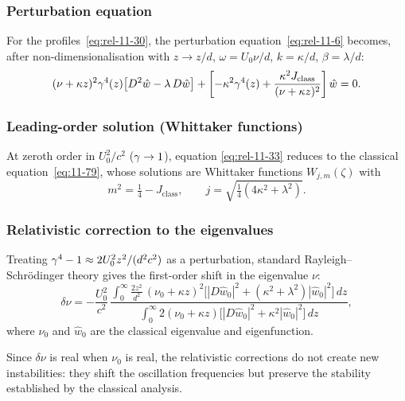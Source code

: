 \subsubsection{Perturbation equation}
For the profiles~\eqref{eq:rel-11-30}, the perturbation
equation~\eqref{eq:rel-11-6} becomes, after non-dimensionalisation
with $z\to z/d$, $\omega=U_{0}\nu/d$, $k=\kappa/d$,
$\beta=\lambda/d$:
\begin{equation}
\label{eq:rel-11-33}
(\nu+\kappa z)^{2}\gamma^{4}(z)
\bigl[D^{2}\hat{w}-\lambda\,D\hat{w}\bigr]
+\left[
  -\kappa^{2}\gamma^{4}(z)
  +\frac{\kappa^{2}J_{\mathrm{class}}}{(\nu+\kappa z)^{2}}
\right]\hat{w} = 0.
\end{equation}

\subsubsection{Leading-order solution (Whittaker functions)}
At zeroth order in $U_{0}^{2}/c^{2}$ ($\gamma\to 1$), equation
\eqref{eq:rel-11-33} reduces to the classical equation~\eqref{eq:11-79},
whose solutions are Whittaker functions $W_{j,m}(\zeta)$ with
\begin{equation}
\label{eq:rel-11-34}
m^{2} = \tfrac{1}{4} - J_{\mathrm{class}},\qquad
j = \sqrt{\tfrac{1}{4}(4\kappa^{2}+\lambda^{2})}.
\end{equation}

\subsubsection{Relativistic correction to the eigenvalues}
Treating $\gamma^{4}-1\approx 2U_{0}^{2}z^{2}/(d^{2}c^{2})$ as a
perturbation, standard Rayleigh--Schr\"odinger theory gives the
first-order shift in the eigenvalue $\nu$:
\begin{equation}
\label{eq:rel-11-35}
\delta\nu
= -\frac{U_{0}^{2}}{c^{2}}\,
  \frac{\displaystyle\int_{0}^{\infty}
    \frac{2z^{2}}{d^{2}}\,
    (\nu_{0}+\kappa z)^{2}
    \bigl[|D\hat{w}_{0}|^{2}+(\kappa^{2}+\lambda^{2})|\hat{w}_{0}|^{2}\bigr]\,dz}
  {\displaystyle\int_{0}^{\infty}
    2(\nu_{0}+\kappa z)
    \bigl[|D\hat{w}_{0}|^{2}+\kappa^{2}|\hat{w}_{0}|^{2}\bigr]\,dz},
\end{equation}
where $\nu_{0}$ and $\hat{w}_{0}$ are the classical eigenvalue and
eigenfunction.

Since $\delta\nu$ is real when $\nu_{0}$ is real, the relativistic
corrections do not create new instabilities: they shift the oscillation
frequencies but preserve the stability established by the classical
analysis.

